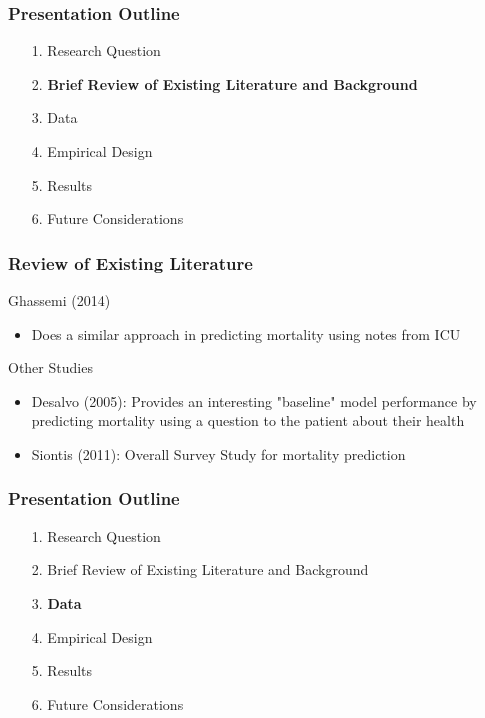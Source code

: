 \documentclass{beamer}
\begin{document}
\begin{frame}
\label{Presentation Outline 2}
\frametitle{Presentation Outline}
\begin{enumerate}
\item[1.] Research Question
\newline
\item[2.] \textbf{Brief Review of Existing Literature and Background}
\newline
\item[3.] Data
\newline
\item[4.] Empirical Design
\newline
\item[5.] Results
\newline
\item[6.] Future Considerations
\end{enumerate}
\end{frame}

\begin{frame}
\label{Literature Review}
\frametitle{Review of Existing Literature}
Ghassemi (2014)
\begin{itemize}
\item Does a similar approach in predicting mortality using notes from ICU
\newline
\end{itemize}

Other Studies
\begin{itemize}
\item Desalvo (2005): Provides an interesting "baseline" model performance by predicting mortality using a question to the patient about their health

\item Siontis (2011): Overall Survey Study for mortality prediction
\end{itemize}
\end{frame}

\begin{frame}
\label{Presentation Outline 3}
\frametitle{Presentation Outline}
\begin{enumerate}
\item[1.] Research Question
\newline
\item[2.] Brief Review of Existing Literature and Background
\newline
\item[3.] \textbf{Data}
\newline
\item[4.] Empirical Design
\newline
\item[5.] Results
\newline
\item[6.] Future Considerations
\end{enumerate}
\end{frame}
\end{document}
